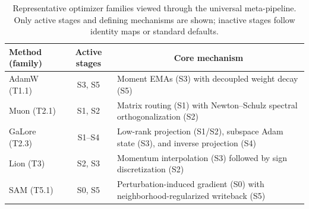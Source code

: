 \begin{table}[t]
  \centering
  \caption{Representative optimizer families viewed through the universal
  meta-pipeline. Only active stages and defining mechanisms are shown; inactive
  stages follow identity maps or standard defaults.}
  \label{tab:meta_pipeline_examples}
  \footnotesize
  \setlength{\tabcolsep}{6pt}
  \renewcommand{\arraystretch}{1.10}
  \begin{tabular}{@{}lcl@{}}
    \toprule
    Method (family) &
    \multicolumn{1}{c}{Active stages} &
    \multicolumn{1}{c}{Core mechanism} \\
    \midrule
    AdamW (T1.1)
      & S3, S5
      & Moment EMAs (S3) with decoupled weight decay (S5) \\
    Muon (T2.1)
      & S1, S2
      & Matrix routing (S1) with Newton--Schulz spectral orthogonalization (S2) \\
    GaLore (T2.3)
      & S1--S4
      & Low-rank projection (S1/S2), subspace Adam state (S3), and inverse projection (S4) \\
    Lion (T3)
      & S2, S3
      & Momentum interpolation (S3) followed by sign discretization (S2) \\
    SAM (T5.1)
      & S0, S5
      & Perturbation-induced gradient (S0) with neighborhood-regularized writeback (S5) \\
    \bottomrule
  \end{tabular}
\end{table}
